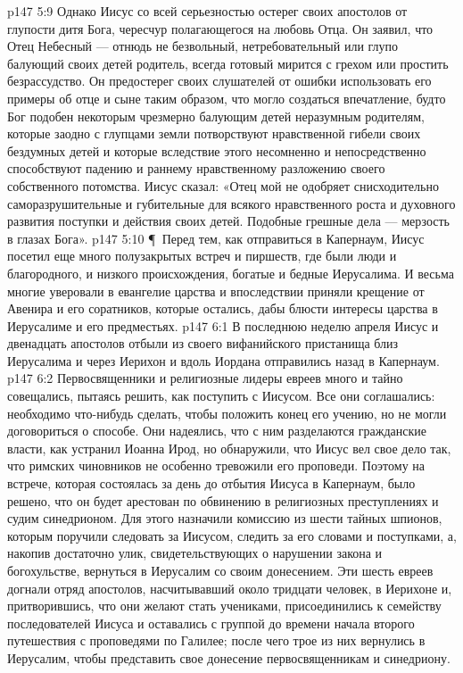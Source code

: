 \vs p147 5:9 Однако Иисус со всей серьезностью остерег своих апостолов от глупости дитя Бога, чересчур полагающегося на любовь Отца. Он заявил, что Отец Небесный --- отнюдь не безвольный, нетребовательный или глупо балующий своих детей родитель, всегда готовый мирится с грехом или простить безрассудство. Он предостерег своих слушателей от ошибки использовать его примеры об отце и сыне таким образом, что могло создаться впечатление, будто Бог подобен некоторым чрезмерно балующим детей неразумным родителям, которые заодно с глупцами земли потворствуют нравственной гибели своих бездумных детей и которые вследствие этого несомненно и непосредственно способствуют падению и раннему нравственному разложению своего собственного потомства. Иисус сказал: «Отец мой не одобряет снисходительно саморазрушительные и губительные для всякого нравственного роста и духовного развития поступки и действия своих детей. Подобные грешные дела --- мерзость в глазах Бога».
\vs p147 5:10 \P\ Перед тем, как отправиться в Капернаум, Иисус посетил еще много полузакрытых встреч и пиршеств, где были люди и благородного, и низкого происхождения, богатые и бедные Иерусалима. И весьма многие уверовали в евангелие царства и впоследствии приняли крещение от Авенира и его соратников, которые остались, дабы блюсти интересы царства в Иерусалиме и его предместьях.
\vs p147 6:1 В последнюю неделю апреля Иисус и двенадцать апостолов отбыли из своего вифанийского пристанища близ Иерусалима и через Иерихон и вдоль Иордана отправились назад в Капернаум.
\vs p147 6:2 Первосвященники и религиозные лидеры евреев много и тайно совещались, пытаясь решить, как поступить с Иисусом. Все они соглашались: необходимо что\hyp{}нибудь сделать, чтобы положить конец его учению, но не могли договориться о способе. Они надеялись, что с ним разделаются гражданские власти, как устранил Иоанна Ирод, но обнаружили, что Иисус вел свое дело так, что римских чиновников не особенно тревожили его проповеди. Поэтому на встрече, которая состоялась за день до отбытия Иисуса в Капернаум, было решено, что он будет арестован по обвинению в религиозных преступлениях и судим синедрионом. Для этого назначили комиссию из шести тайных шпионов, которым поручили следовать за Иисусом, следить за его словами и поступками, а, накопив достаточно улик, свидетельствующих о нарушении закона и богохульстве, вернуться в Иерусалим со своим донесением. Эти шесть евреев догнали отряд апостолов, насчитывавший около тридцати человек, в Иерихоне и, притворившись, что они желают стать учениками, присоединились к семейству последователей Иисуса и оставались с группой до времени начала второго путешествия с проповедями по Галилее; после чего трое из них вернулись в Иерусалим, чтобы представить свое донесение первосвященникам и синедриону.
